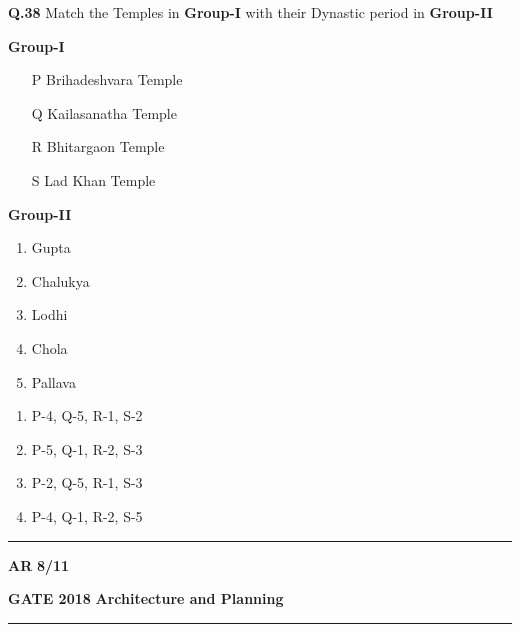 \documentclass[journal,12pt,onecolumn]{IEEEtran}
\theoremstyle{remark}
\begin{document}
\noindent\textbf{Q.38} Match the Temples in \textbf{Group-I} with their Dynastic period in \textbf{Group-II}
\begin{multicols}{2}
    

\textbf{Group-I}
\begin{enumerate}[label=\Alph*,leftmargin=1.5cm]
    \item [P] \hspace{0.2cm} Brihadeshvara Temple
    \item [Q] \hspace{0.2cm} Kailasanatha Temple
    \item [R] \hspace{0.2cm} Bhitargaon Temple
    \item [S] \hspace{0.2cm} Lad Khan Temple
\end{enumerate}
\columnbreak \noindent
\hspace{1cm} \textbf{Group-II}
\begin{enumerate}
    \item Gupta
    \item Chalukya
    \item Lodhi
    \item Chola
    \item Pallava
\end{enumerate}
\end{multicols}

\begin{multicols}{2}
\begin{enumerate}[label=(\Alph*),leftmargin = 1.5cm ]
    \item P-4, Q-5, R-1, S-2
    \item P-5, Q-1, R-2, S-3
    \item P-2, Q-5, R-1, S-3
    \item P-4, Q-1, R-2, S-5
\end{enumerate}
\end{multicols}

 \noindent
\hrule \vspace{0.0875CM} \textbf{AR} \hfill  \textbf{8/11}

\newpage

\noindent
\textbf{GATE 2018} \hfill \textbf{Architecture and Planning}
\vspace{0.0012cm} \hrule
\end{document}
